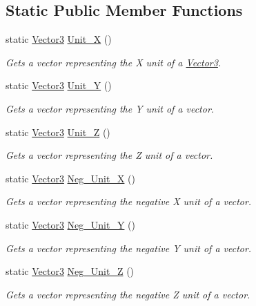 \subsection*{Static Public Member Functions}
\begin{DoxyCompactItemize}
\item 
static \hyperlink{classphys_1_1Vector3}{Vector3} \hyperlink{classphys_1_1Vector3_aa2f573233982cb27cb05e5bfe38b327e}{Unit\_\-X} ()
\begin{DoxyCompactList}\small\item\em Gets a vector representing the X unit of a \hyperlink{classphys_1_1Vector3}{Vector3}. \item\end{DoxyCompactList}\item 
static \hyperlink{classphys_1_1Vector3}{Vector3} \hyperlink{classphys_1_1Vector3_ab9d8ea65d744278a87aeeeea059d5895}{Unit\_\-Y} ()
\begin{DoxyCompactList}\small\item\em Gets a vector representing the Y unit of a vector. \item\end{DoxyCompactList}\item 
static \hyperlink{classphys_1_1Vector3}{Vector3} \hyperlink{classphys_1_1Vector3_a9c25ec99cf982fe28eeaff4ddfc67715}{Unit\_\-Z} ()
\begin{DoxyCompactList}\small\item\em Gets a vector representing the Z unit of a vector. \item\end{DoxyCompactList}\item 
static \hyperlink{classphys_1_1Vector3}{Vector3} \hyperlink{classphys_1_1Vector3_aa94ab8ce5d5cab51a4c2ef1e78430731}{Neg\_\-Unit\_\-X} ()
\begin{DoxyCompactList}\small\item\em Gets a vector representing the negative X unit of a vector. \item\end{DoxyCompactList}\item 
static \hyperlink{classphys_1_1Vector3}{Vector3} \hyperlink{classphys_1_1Vector3_a0ac8b5f2e0d28de9294502c1e4391b8c}{Neg\_\-Unit\_\-Y} ()
\begin{DoxyCompactList}\small\item\em Gets a vector representing the negative Y unit of a vector. \item\end{DoxyCompactList}\item 
static \hyperlink{classphys_1_1Vector3}{Vector3} \hyperlink{classphys_1_1Vector3_a2e5bc13758eaa6a45ae45fbb9df0c732}{Neg\_\-Unit\_\-Z} ()
\begin{DoxyCompactList}\small\item\em Gets a vector representing the negative Z unit of a vector. \item\end{DoxyCompactList}\end{DoxyCompactItemize}
